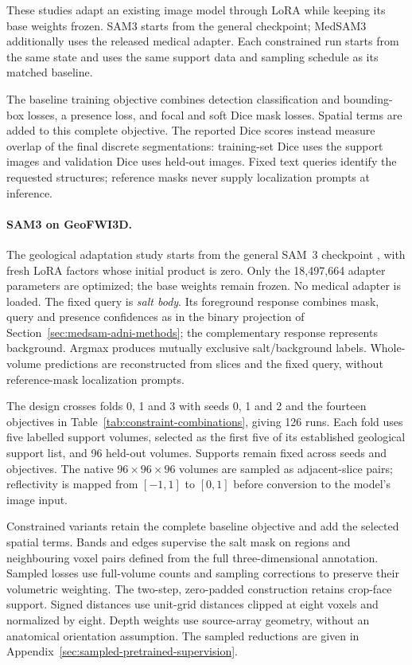 \documentclass[12pt,a4paper]{article}
\begin{document}
These studies adapt an existing image model through LoRA while keeping
its base weights frozen. SAM3 starts from the general checkpoint;
MedSAM3 additionally uses the released medical adapter. Each constrained
run starts from the same state and uses the same support data and
sampling schedule as its matched baseline.

The baseline training objective combines detection classification and
bounding-box losses, a presence loss, and focal and soft Dice mask losses.
Spatial terms are added to this complete objective. The reported Dice
scores instead measure overlap of the final discrete segmentations:
training-set Dice uses the support images and validation Dice uses
held-out images. Fixed text queries identify the requested structures;
reference masks never supply localization prompts at inference.

\paragraph{SAM3 on GeoFWI3D.}
\label{sec:sam3-methods}


The geological adaptation study starts from the general SAM~3 checkpoint
\cite{carion2025sam3}, with fresh LoRA factors whose initial product is
zero. Only the 18,497,664 adapter parameters are optimized; the base
weights remain frozen. No medical adapter is loaded. The fixed query is
\emph{salt body}. Its foreground response combines mask, query and
presence confidences as in the binary projection of
Section~\ref{sec:medsam-adni-methods}; the complementary response represents
background. Argmax produces mutually exclusive salt/background labels.
Whole-volume predictions are reconstructed from slices and the fixed
query, without reference-mask localization prompts.

The design crosses folds 0, 1 and 3 with seeds 0, 1 and 2 and the fourteen
objectives in Table~\ref{tab:constraint-combinations}, giving 126 runs.
Each fold uses five labelled support volumes, selected as the first five
of its established geological support list, and 96 held-out volumes.
Supports remain fixed across seeds and objectives. The native
$96\times96\times96$ volumes are sampled as adjacent-slice pairs;
reflectivity is mapped from $[-1,1]$ to $[0,1]$ before conversion to the
model's image input.


Constrained variants retain the complete baseline objective and add the
selected spatial terms. Bands and edges supervise the salt
mask on regions and neighbouring voxel pairs defined from the full
three-dimensional annotation. Sampled losses use full-volume counts
and sampling corrections to preserve their volumetric weighting. The two-step,
zero-padded construction retains crop-face support. Signed distances
use unit-grid distances clipped at eight voxels and normalized by eight.
Depth weights use source-array geometry, without an anatomical
orientation assumption. The sampled reductions are given in
Appendix~\ref{sec:sampled-pretrained-supervision}.
\end{document}
